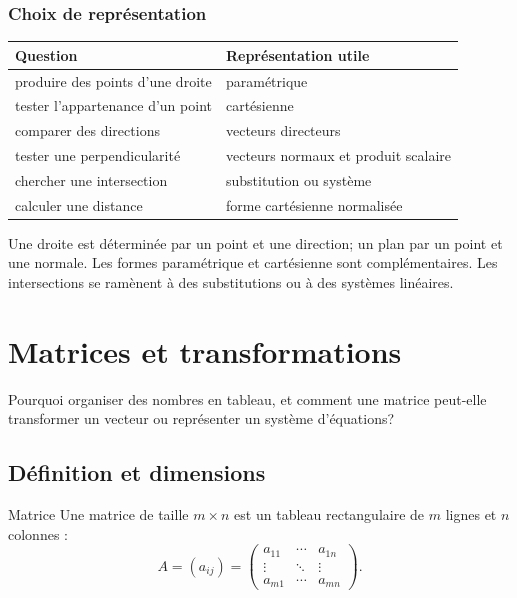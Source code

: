 \documentclass[12pt,a4paper,openany]{book}
\begin{document}
\subsection{Choix de représentation}

\begin{center}
\begin{tabularx}{\textwidth}{@{}lY@{}}
\toprule
Question & Représentation utile\\\midrule
produire des points d'une droite & paramétrique\\
tester l'appartenance d'un point & cartésienne\\
comparer des directions & vecteurs directeurs\\
tester une perpendicularité & vecteurs normaux et produit scalaire\\
chercher une intersection & substitution ou système\\
calculer une distance & forme cartésienne normalisée\\
\bottomrule
\end{tabularx}
\end{center}

\begin{summarybox}
Une droite est déterminée par un point et une direction; un plan par un point et une normale. Les formes paramétrique et cartésienne sont complémentaires. Les intersections se ramènent à des substitutions ou à des systèmes linéaires.
\end{summarybox}


\chapter{Matrices et transformations}

\begin{questionbox}
Pourquoi organiser des nombres en tableau, et comment une matrice peut-elle transformer un vecteur ou représenter un système d'équations?
\end{questionbox}

\section{Définition et dimensions}

\begin{definition}{Matrice}{}
Une matrice de taille $m\times n$ est un tableau rectangulaire de $m$ lignes et $n$ colonnes :
\[
A=(a_{ij})=
\begin{pmatrix}
a_{11}&\cdots&a_{1n}\\
\vdots&\ddots&\vdots\\
a_{m1}&\cdots&a_{mn}
\end{pmatrix}.
\]
\end{definition}
\end{document}

